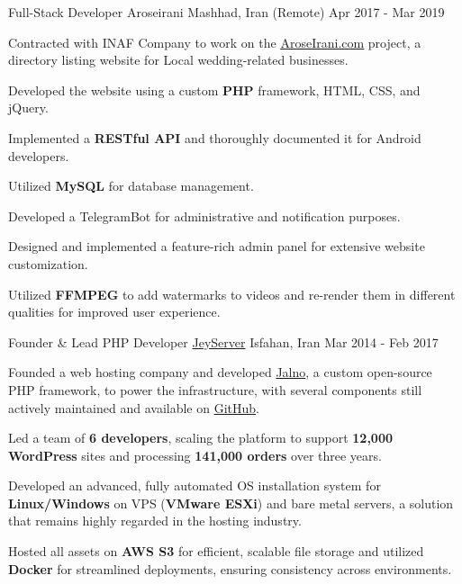 \begin{cventries}
  \cventry
    {Full-Stack Developer} %
    {Aroseirani} %
    {Mashhad, Iran (Remote)} %
    {Apr 2017 - Mar 2019} %
    {
      \begin{cvitems} %
        \item {Contracted with INAF Company to work on the \href{https://aroseirani.com}{\underline{AroseIrani.com}} project, a directory listing website for Local wedding-related businesses.}
        \item {Developed the website using a custom \textbf{PHP} framework, HTML, CSS, and jQuery.}
        \item {Implemented a \textbf{RESTful API} and thoroughly documented it for Android developers.}
        \item {Utilized \textbf{MySQL} for database management.}
        \item {Developed a TelegramBot for administrative and notification purposes.}
        \item {Designed and implemented a feature-rich admin panel for extensive website customization.}
        \item {Utilized \textbf{FFMPEG} to add watermarks to videos and re-render them in different qualities for improved user experience.}
      \end{cvitems}
    }

  \cventry
    {Founder \& Lead PHP Developer} %
    {\href{https://jeyserver.com}{JeyServer}} %
    {Isfahan, Iran} %
    {Mar 2014 - Feb 2017} %
    {
      \begin{cvitems}
        \item {Founded a web hosting company and developed \href{https://jalno.ir/en/}{Jalno}, a custom open-source PHP framework, to power the infrastructure, with several components still actively maintained and available on \href{https://github.com/jeyserver}{GitHub}.}
        \item {Led a team of \textbf{6 developers}, scaling the platform to support \textbf{12,000 WordPress} sites and processing \textbf{141,000 orders} over three years.}
        \item {Developed an advanced, fully automated OS installation system for \textbf{Linux/Windows} on VPS (\textbf{VMware ESXi}) and bare metal servers, a solution that remains highly regarded in the hosting industry.}
        \item {Hosted all assets on \textbf{AWS S3} for efficient, scalable file storage and utilized \textbf{Docker} for streamlined deployments, ensuring consistency across environments.}
      \end{cvitems}
    }
  

\end{cventries}
